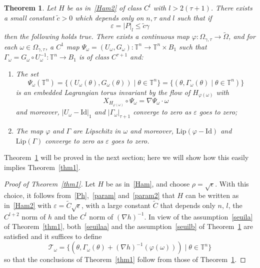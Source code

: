 \documentclass[11pt]{article}
\let\mathcal\mathscr
\let\sep\mid
\numberwithin{equation}{section}
\theoremstyle{plain}
\newtheorem{Main}{Theorem}
\theoremstyle{definition}
\newcommand\T{\mathbb T}
\begin{document}
\begin{Main}\label{thm2}
Let $H$ be as in~\eqref{Ham2} of class $C^l$ with $l>2(\tau+1)$. There exists a small constant $\tilde{c}>0$ which depends only on $n,\tau$ and $l$ such that if
\begin{equation}\label{seuilb}
\varepsilon=|P|_l \leq \tilde{c} \gamma
\end{equation}
then the following holds true. There exists a continuous map $\varphi : \Omega_{\gamma,\tau} \to \tilde{\Omega}$, and for each $\omega \in \Omega_{\gamma,\tau}$, a $C^1$ map $\Psi_\omega=(U_\omega,G_\omega) : \T^n \to \T^n \times B_1$ such that $\Gamma_\omega=G_\omega \circ U_\omega^{-1} : \T^n \to B_1$ is of class $C^{\tau+1}$ and:

\begin{enumerate}
\item
The set
\[ \Psi_\omega(\T^n)=\{(U_\omega(\theta),G_\omega(\theta)) \sep \theta \in \T^n\} =\{(\theta,\Gamma_\omega(\theta) \sep \theta \in \T^n)\} \]
is an embedded Lagrangian torus invariant by the flow of $H_{\varphi(\omega)}$ with
\[ X_{H_{\varphi(\omega)}} \circ \Psi_\omega=\nabla \Psi_\omega\cdot \omega \]
and moreover, $|U_\omega-\mathrm{Id}|_1$ and $|\Gamma_\omega|_{\tau+1}$ converge to zero as $\varepsilon$ goes to zero;

\item
The map $\varphi$ and $\Gamma$ are Lipschitz in $\omega$ and moreover, $\mathrm{Lip}(\varphi-\mathrm{Id})$ and $\mathrm{Lip}(\Gamma)$ converge to zero as $\varepsilon$ goes to zero.
\end{enumerate}
\end{Main}

Theorem~\ref{thm2} will be proved in the next section; here we will show how this easily implies Theorem~\ref{thm1}.

\begin{proof}[Proof of Theorem~\ref{thm1}]
Let $H$ be as in~\eqref{Ham}, and choose $\rho=\sqrt{\epsilon}$. With this choice, it follows from~\eqref{Ph},~\eqref{param} and~\eqref{param2} that $H$ can be written as in~\eqref{Ham2} with $\varepsilon=\tilde{C}\sqrt{\epsilon}$, with a large constant $\tilde{C}$ that depends only $n$, $l$, the $C^{l+2}$ norm of $h$ and the $C^{l}$ norm of $(\nabla h)^{-1}$. In view of the assumption~\eqref{seuila} of Theorem~\ref{thm1}, both~\eqref{seuilaa} and the assumption~\eqref{seuilb} of Theorem~\ref{thm2} are satisfied and it suffices to define
\[ \mathcal{T}_\omega=\{(\theta,\Gamma_\omega(\theta)+(\nabla h)^{-1}(\varphi(\omega))) \sep \theta \in \T^n\} \]
so that the conclusions of Theorem~\ref{thm1} follow from those of Theorem~\ref{thm2}.
\end{proof}
\end{document}

